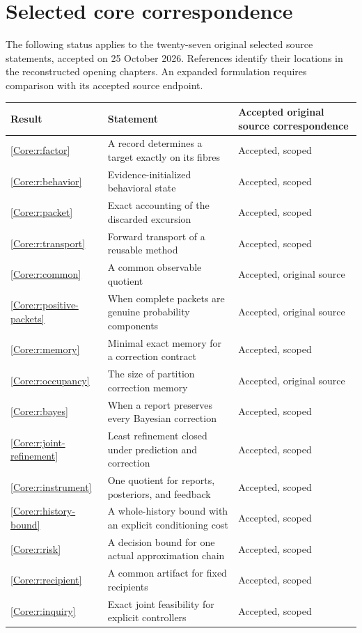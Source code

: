\documentclass[11pt,oneside,openany]{book}
\numberwithin{equation}{section}
\begin{document}
\section*{Selected core correspondence}
The following status applies to the twenty-seven original selected source statements, accepted on 25 October 2026. References identify their locations in the reconstructed opening chapters. An expanded formulation requires comparison with its accepted source endpoint.
\small
\begin{longtable}{@{}p{.11\linewidth}p{.55\linewidth}p{.25\linewidth}@{}}\toprule Result & Statement & Accepted original source correspondence\\\midrule\endhead
\ref{Core:r:factor} & A record determines a target exactly on its fibres & Accepted, scoped\\
\ref{Core:r:behavior} & Evidence-initialized behavioral state & Accepted, scoped\\
\ref{Core:r:packet} & Exact accounting of the discarded excursion & Accepted, scoped\\
\ref{Core:r:transport} & Forward transport of a reusable method & Accepted, scoped\\
\ref{Core:r:common} & A common observable quotient & Accepted, original source\\
\ref{Core:r:positive-packets} & When complete packets are genuine probability components & Accepted, original source\\
\ref{Core:r:memory} & Minimal exact memory for a correction contract & Accepted, scoped\\
\ref{Core:r:occupancy} & The size of partition correction memory & Accepted, original source\\
\ref{Core:r:bayes} & When a report preserves every Bayesian correction & Accepted, scoped\\
\ref{Core:r:joint-refinement} & Least refinement closed under prediction and correction & Accepted, scoped\\
\ref{Core:r:instrument} & One quotient for reports, posteriors, and feedback & Accepted, scoped\\
\ref{Core:r:history-bound} & A whole-history bound with an explicit conditioning cost & Accepted, scoped\\
\ref{Core:r:risk} & A decision bound for one actual approximation chain & Accepted, scoped\\
\ref{Core:r:recipient} & A common artifact for fixed recipients & Accepted, scoped\\
\ref{Core:r:inquiry} & Exact joint feasibility for explicit controllers & Accepted, scoped\\

\end{longtable}
\end{document}
